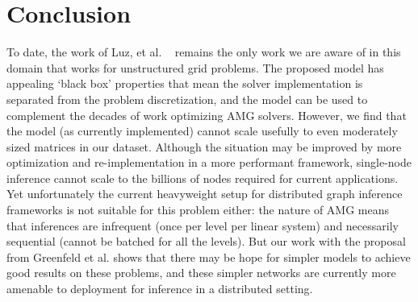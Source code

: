 \documentclass{svproc}
\newcommand{\etal}{et al. }
\begin{document}









\section{Conclusion}
To date, the work of Luz, \etal~\cite{Luz2020} remains the only work we are aware of in this domain that works for unstructured grid problems. The proposed model has appealing `black box' properties that mean the solver implementation is separated from the problem discretization, and the model can be used to complement the decades of work optimizing AMG solvers. However, we find that the model (as currently implemented) cannot scale usefully to even moderately sized matrices in our dataset. Although the situation may be improved by more optimization and re-implementation in a more performant framework, single-node inference cannot scale to the billions of nodes required for current applications. Yet unfortunately the current heavyweight setup for distributed graph inference frameworks is not suitable for this problem either: the nature of AMG means that inferences are infrequent (once per level per linear system) and necessarily sequential (cannot be batched for all the levels).  But our work with the proposal from Greenfeld \etal shows that there may be hope for simpler models to achieve good results on these problems, and these simpler networks are currently more amenable to deployment for inference in a distributed setting.
\end{document}
